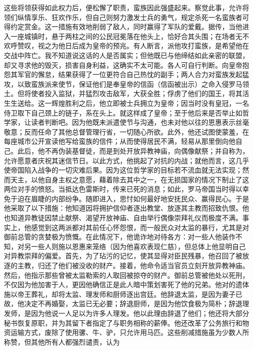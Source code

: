 这些将领获得如此权力后，便松懈了职责，蛮族因此强盛起来。察觉此事，允许将领们纵情享乐、狂欢作乐，但自己则努力激发士兵的勇气，规定杀死一名蛮族者可得约定赏金。这一措施有效地削弱了敌人，同时赢得了军队的爱戴。据传，当他进入一座城镇时，悬于两柱之间的公民冠冕落在他头上，恰好合其头围；在场者无不欢呼赞叹，视之为他日后成为皇帝的预兆。有人断言，派他攻打蛮族，是希望他在交战中阵亡。我不知道说这话的人是否属实；但他既已与他缔结如此亲密的联盟，却又寻求他的毁灭，损害自身利益，这确实不太可能。各人可自行判断。向皇帝抱怨其军官的懈怠，结果获得了一位更符合自己热忱的副手；两人合力对蛮族发起猛攻，以致蛮族派来使节，保证他们是奉皇帝的信函（信函被出示）之命入侵罗马领土。但将使者投入监狱，并猛烈攻击敌军，大获全胜；俘虏了他们的国王，将其活生生送给。这一辉煌胜利之后，他立即被士兵拥立为皇帝；因当时没有皇冠，一名侍卫取下自己颈上的链子，系在头上。就这样成了皇帝；至于他后来是否举止如哲学家，让读者判断吧。因为他既未派遣使节与沟通，也未对他以往的恩惠表示丝毫敬意；反而任命了其他总督管理行省，一切随心所欲。此外，他还试图使蒙羞，在每座城市公开宣读他写给蛮族的信件；从而使得居民不满，轻易从那里倒向他自己。此后，他不再伪装基督徒，而是到处开放异教神庙，向偶像献祭；并自称为，允许愿意者庆祝其迷信节日。以此方式，他挑起了对抗的内战；就他而言，这几乎使帝国陷入战争的一切灾难后果。因为这位哲学家的目标若不流血就无法实现；然而天主，以他自身主权之意愿，藉着除去其中之一，在无损国家的情况下制止了这两位对手的愤怒。当抵达色雷斯时，传来已死的消息；如此，罗马帝国当时得以幸免于迫在眉睫的内部纷争。随即进入，思忖如何最好地安抚民众、赢得民心。于是他采取了以下措施：他知道因将拥护信仰者逐出教堂、放逐其主教而招致仇恨。他也知道异教徒因禁止献祭、渴望开放神庙、自由举行偶像崇拜礼仪而极度不满。事实上，他感觉到这两派都对其前任心怀怨恨，而一般民众对太监的暴行，尤其是对御前总管的贪婪极为愤慨。在此情况下，他诡诈地对待各方：对一些人他装作不知，对另一些人则施以恩惠来笼络（因为他喜欢表现仁慈），但总体上他显明自己对异教崇拜的偏爱。首先，为了玷污的记忆，使其显得对臣民残暴，他召回了被放逐的主教，归还了他们被没收的财产。接着，他命令适当官员立刻开放异教神庙。然后，他指示那些曾被太监勒索的人取回被掠夺的财产。御前总管被他处以死刑，不仅因为他加害于人，更因他确信正是此人暗中策划害死了他的兄弟。他对的遗体施以帝王葬礼，却将太监、理发师和厨师逐出宫廷。他辞退太监，是因为妻子已故，他决定不再婚娶，太监已无必要；辞退厨师，是因为他饮食极为简朴；辞退理发师，是因为他说一人足以为许多人理发。他以此理由辞退了他们；他还将大部分秘书恢复原职，并为其留下者指定了与职务相称的薪俸。他还改革了公务旅行和物资运输方式，废除了使用骡、牛、驴，只允许用马匹。这些削减措施虽为少数人所称赞，但其他所有人都强烈谴责，认为